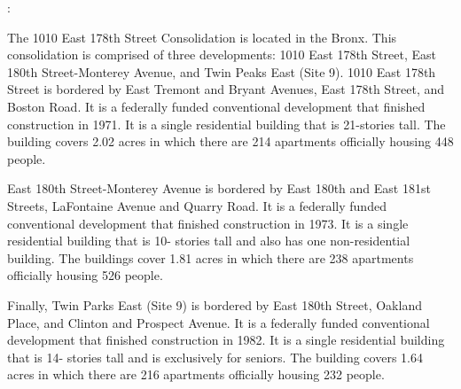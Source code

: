 :      

    

The 1010 East 178th Street Consolidation is located in the Bronx. This consolidation is comprised of three developments: 1010 East 178th Street, East 180th Street-Monterey Avenue, and Twin Peaks East (Site 9). 1010 East 178th Street is bordered by East Tremont and Bryant Avenues, East 178th Street, and Boston Road. It is a federally funded conventional development that finished construction in 1971. It is a single residential building that is 21-stories tall. The building covers 2.02 acres in which there are 214 apartments officially housing 448 people.  

East 180th Street-Monterey Avenue is bordered by East 180th and East 181st Streets, LaFontaine Avenue and Quarry Road. It is a federally funded conventional development that finished construction in 1973. It is a single residential building that is 10- stories tall and also has one non-residential building. The buildings cover 1.81 acres in which there are 238 apartments officially housing 526 people.  

Finally, Twin Parks East (Site 9) is bordered by East 180th Street, Oakland Place, and Clinton and Prospect Avenue. It is a federally funded conventional development that finished construction in 1982. It is a single residential building that is 14- stories tall and is exclusively for seniors. The building covers 1.64 acres in which there are 216 apartments officially housing 232 people.  